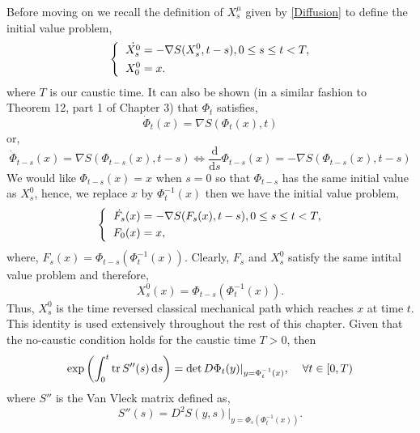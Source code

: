 \documentclass[a4paper,12pt,draft]{report}
\begin{document}
Before moving on we recall the definition of $X_s^\mu$ given by \eqref{Diffusion} to define the initial value problem,
$$
\left\{
\begin{aligned}
\dot{X_s^0} & = -\nabla S(X_s^0, t - s), 0 \le s \le t < T,\\
\hspace{0.2cm}X_0^0 & = x.
\end{aligned}
\right.
$$
where $T$ is our caustic time.  It can also be shown (in a similar fashion to Theorem 12, part 1 of Chapter 3) that $\Phi_t$ satisfies,
$$
\dot{\Phi}_t(x) = \nabla S(\Phi_t(x), t)
$$
or,
$$
\dot{\Phi}_{t - s}(x) = \nabla S(\Phi_{t - s}(x), t - s) \Leftrightarrow \frac{\mathrm{d}}{\mathrm{d} s}\Phi_{t - s}(x) = -\nabla S(\Phi_{t - s}(x), t - s)
$$
We would like $\Phi_{t - s}(x) = x$ when $s = 0$ so that $\Phi_{t - s}$ has the same initial value as $X_s^0$, hence, we replace $x$ by $\Phi_t^{-1}(x)$ then we have the initial value problem,
$$
\left\{
\begin{aligned}
\dot{F_s}(x) & = -\nabla S(F_s(x), t - s), 0 \le s \le t < T,\\
\hspace{0.2cm}F_0(x) & = x,
\end{aligned}
\right.
$$
where, $F_s(x) = \Phi_{t - s}(\Phi_t^{-1}(x))$.  Clearly, $F_s$ and $X_s^0$ satisfy the same intital value problem and therefore,
$$
X_s^0(x) = \Phi_{t - s}(\Phi_t^{-1}(x)).
$$
Thus, $X_s^0$ is the time reversed classical mechanical path which reaches $x$ at time $t$.  This identity is used extensively throughout the rest of this chapter.
\theorem
{
Given that the no-caustic condition holds for the caustic time $T > 0$, then
$$
\exp\left(\int_0^t \mathrm{tr}\,S''(s)\,\mathrm{d}s\right) = \det D\Phi_t(y)|_{y = \Phi_t^{-1}(x)}, \hspace{0.4cm}\forall t \in [0, T)
$$
where $S''$ is the Van Vleck matrix defined as,
$$
S''(s) = D^2S(y, s)|_{y = \Phi_s(\Phi_t^{-1}(x))}.
$$
}
\proof
\end{document}
